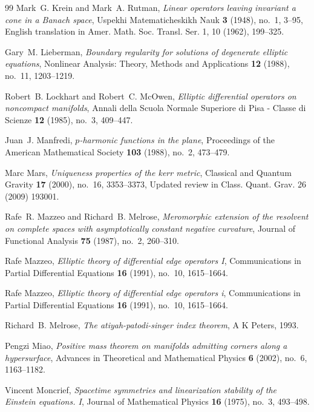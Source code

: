 \documentclass[12pt]{article}
\theoremstyle{plain}
\theoremstyle{definition}
\theoremstyle{remark}
\begin{document}
\begin{thebibliography}{99}
Mark~G. Krein and Mark~A. Rutman, \emph{Linear operators leaving invariant a cone in a Banach space}, Uspekhi Matematicheskikh Nauk \textbf{3} (1948), no.~1, 3--95, English translation in Amer. Math. Soc. Transl. Ser. 1, 10 (1962), 199--325.

Gary~M. Lieberman, \emph{Boundary regularity for solutions of degenerate
  elliptic equations}, Nonlinear Analysis: Theory, Methods and Applications
  \textbf{12} (1988), no.~11, 1203--1219.

Robert~B. Lockhart and Robert~C. McOwen, \emph{Elliptic differential operators
  on noncompact manifolds}, Annali della Scuola Normale Superiore di Pisa -
  Classe di Scienze \textbf{12} (1985), no.~3, 409--447.

Juan~J. Manfredi, \emph{$p$-harmonic functions in the plane}, Proceedings of
  the American Mathematical Society \textbf{103} (1988), no.~2, 473--479.

Marc Mars, \emph{Uniqueness properties of the kerr metric}, Classical and
  Quantum Gravity \textbf{17} (2000), no.~16, 3353--3373, Updated review in
  Class. Quant. Grav. 26 (2009) 193001.

Rafe~R. Mazzeo and Richard~B. Melrose, \emph{Meromorphic extension of the resolvent on complete spaces with asymptotically constant negative curvature}, Journal of Functional Analysis \textbf{75} (1987), no.~2, 260--310.

Rafe Mazzeo, \emph{Elliptic theory of differential edge operators I}, Communications in Partial Differential Equations \textbf{16} (1991), no.~10, 1615--1664.

Rafe Mazzeo, \emph{Elliptic theory of differential edge operators i},
  Communications in Partial Differential Equations \textbf{16} (1991), no.~10,
  1615--1664.

Richard~B. Melrose, \emph{The atiyah-patodi-singer index theorem}, A K Peters,
  1993.

Pengzi Miao, \emph{Positive mass theorem on manifolds admitting corners along a
  hypersurface}, Advances in Theoretical and Mathematical Physics \textbf{6}
  (2002), no.~6, 1163--1182.

Vincent Moncrief, \emph{Spacetime symmetries and linearization stability of the
  {E}instein equations. {I}}, Journal of Mathematical Physics \textbf{16}
  (1975), no.~3, 493--498.


\end{thebibliography}
\end{document}
